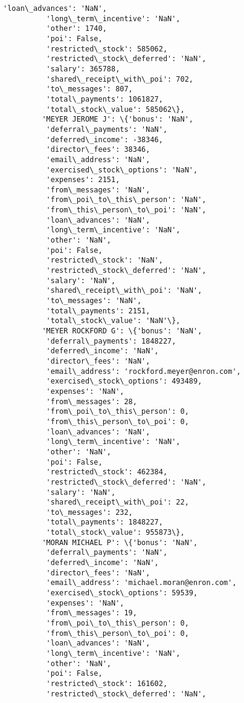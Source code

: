 \documentclass[11pt]{article}
\begin{document}
\begin{Verbatim}[commandchars=\\\{\}]
          'loan\_advances': 'NaN',
          'long\_term\_incentive': 'NaN',
          'other': 1740,
          'poi': False,
          'restricted\_stock': 585062,
          'restricted\_stock\_deferred': 'NaN',
          'salary': 365788,
          'shared\_receipt\_with\_poi': 702,
          'to\_messages': 807,
          'total\_payments': 1061827,
          'total\_stock\_value': 585062\},
         'MEYER JEROME J': \{'bonus': 'NaN',
          'deferral\_payments': 'NaN',
          'deferred\_income': -38346,
          'director\_fees': 38346,
          'email\_address': 'NaN',
          'exercised\_stock\_options': 'NaN',
          'expenses': 2151,
          'from\_messages': 'NaN',
          'from\_poi\_to\_this\_person': 'NaN',
          'from\_this\_person\_to\_poi': 'NaN',
          'loan\_advances': 'NaN',
          'long\_term\_incentive': 'NaN',
          'other': 'NaN',
          'poi': False,
          'restricted\_stock': 'NaN',
          'restricted\_stock\_deferred': 'NaN',
          'salary': 'NaN',
          'shared\_receipt\_with\_poi': 'NaN',
          'to\_messages': 'NaN',
          'total\_payments': 2151,
          'total\_stock\_value': 'NaN'\},
         'MEYER ROCKFORD G': \{'bonus': 'NaN',
          'deferral\_payments': 1848227,
          'deferred\_income': 'NaN',
          'director\_fees': 'NaN',
          'email\_address': 'rockford.meyer@enron.com',
          'exercised\_stock\_options': 493489,
          'expenses': 'NaN',
          'from\_messages': 28,
          'from\_poi\_to\_this\_person': 0,
          'from\_this\_person\_to\_poi': 0,
          'loan\_advances': 'NaN',
          'long\_term\_incentive': 'NaN',
          'other': 'NaN',
          'poi': False,
          'restricted\_stock': 462384,
          'restricted\_stock\_deferred': 'NaN',
          'salary': 'NaN',
          'shared\_receipt\_with\_poi': 22,
          'to\_messages': 232,
          'total\_payments': 1848227,
          'total\_stock\_value': 955873\},
         'MORAN MICHAEL P': \{'bonus': 'NaN',
          'deferral\_payments': 'NaN',
          'deferred\_income': 'NaN',
          'director\_fees': 'NaN',
          'email\_address': 'michael.moran@enron.com',
          'exercised\_stock\_options': 59539,
          'expenses': 'NaN',
          'from\_messages': 19,
          'from\_poi\_to\_this\_person': 0,
          'from\_this\_person\_to\_poi': 0,
          'loan\_advances': 'NaN',
          'long\_term\_incentive': 'NaN',
          'other': 'NaN',
          'poi': False,
          'restricted\_stock': 161602,
          'restricted\_stock\_deferred': 'NaN',

\end{Verbatim}
\end{document}
